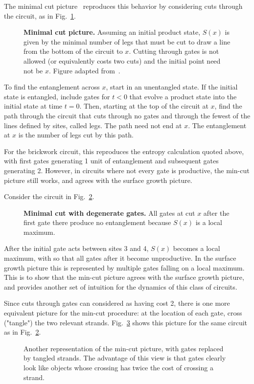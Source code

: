 The minimal cut picture~\cite{Nahum2017} reproduces this behavior by considering cuts through the circuit, as in Fig.~\ref{fig:mincut}.
\begin{figure}
	\centering
	
	\caption{\textbf{Minimal cut picture.} Assuming an initial product state, $S(x)$ is given by the minimal number of legs that must be cut to draw a line from the bottom of the circuit to $x$. Cutting through gates is not allowed (or equivalently costs two cuts) and the initial point need not be $x$. Figure adapted from~\cite{Nahum2017}.}
	\label{fig:mincut}
\end{figure}
To find the entanglement across $x$, start in an unentangled state. If the initial state is entangled, include gates for $t<0$ that evolve a product state into the initial state at time $t=0$. Then, starting at the top of the circuit at $x$, find the path through the circuit that cuts through no gates and through the fewest of the lines defined by sites, called legs. The path need not end at $x$. The entanglement at $x$ is the number of legs cut by this path. 

For the brickwork circuit, this reproduces the entropy calculation quoted above, with first gates generating 1 unit of entanglement and subsequent gates generating 2. However, in circuits where not every gate is productive, the min-cut picture still works, and agrees with the surface growth picture.

Consider the circuit in Fig.~\ref{fig:degeneratemincut}.
\begin{figure}
	\centering
	
	\caption{\textbf{Minimal cut with degenerate gates.} All gates at cut $x$ after the first gate there produce no entanglement because $S(x)$ is a local maximum.}
	\label{fig:degeneratemincut}
\end{figure}
After the initial gate acts between sites 3 and 4, $S(x)$ becomes a local maximum, with so that all gates after it become unproductive. In the surface growth picture this is represented by multiple gates falling on a local maximum. This is to show that the min-cut picture agrees with the surface growth picture, and provides another set of intuition for the dynamics of this class of circuits.

Since cuts through gates can considered as having cost 2, there is one more equivalent picture for the min-cut procedure: at the location of each gate, cross ("tangle") the two relevant strands. Fig.~\ref{fig:anothermincut} shows this picture for the same circuit as in Fig.~\ref{fig:degeneratemincut}.
\begin{figure}
	\centering
	
	\caption{Another representation of the min-cut picture, with gates replaced by tangled strands. The advantage of this view is that gates clearly look like objects whose crossing has twice the cost of crossing a strand.}
	\label{fig:anothermincut}
\end{figure}

